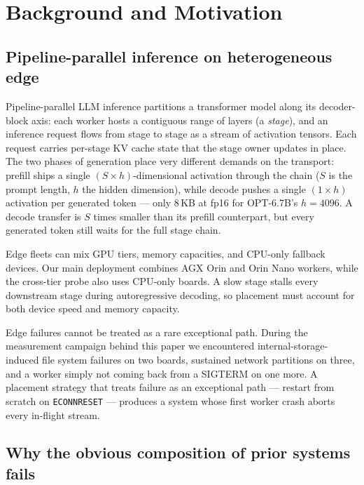 \section{Background and Motivation}\label{sec:background}


\subsection{Pipeline-parallel inference on heterogeneous edge}

Pipeline-parallel LLM inference partitions a transformer model
along its decoder-block axis: each worker hosts a contiguous range
of layers (a \emph{stage}), and an inference request flows from
stage to stage as a stream of activation tensors. Each request
carries per-stage KV cache state that the stage owner updates
in place. The two phases of generation place very different
demands on the transport: prefill ships a single
$(S \times h)$-dimensional activation through the chain ($S$ is
the prompt length, $h$ the hidden dimension), while decode pushes
a single $(1 \times h)$ activation per generated token --- only
$8$\,KB at fp16 for OPT-6.7B's $h=4096$. A decode transfer is
$S$ times smaller than its prefill counterpart, but every generated
token still waits for the full stage chain.

Edge fleets can mix GPU tiers, memory capacities, and CPU-only
fallback devices. Our main deployment combines AGX Orin and Orin Nano
workers, while the cross-tier probe also uses CPU-only boards. A slow
stage stalls every downstream stage during autoregressive decoding, so
placement must account for both device speed and memory capacity.

Edge failures cannot be treated as a rare exceptional path. During
the measurement campaign behind this paper we
encountered internal-storage-induced file system failures on two boards,
sustained network partitions on three, and a worker simply not
coming back from a SIGTERM on one more. A placement strategy that
treats failure as an exceptional path --- restart from scratch on
\texttt{ECONNRESET} --- produces a system whose first worker
crash aborts every in-flight stream.

\subsection{Why the obvious composition of prior systems fails}

